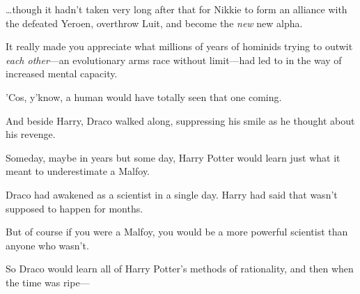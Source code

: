 …though it hadn’t taken very long after that for Nikkie to form an alliance with the defeated Yeroen, overthrow Luit, and become the \emph{new} new alpha.

It really made you appreciate what millions of years of hominids trying to outwit \emph{each other}—an evolutionary arms race without limit—had led to in the way of increased mental capacity.

’Cos, y’know, a human would have totally seen that one coming.

\later

And beside Harry, Draco walked along, suppressing his smile as he thought about his revenge.

Someday, maybe in years but some day, Harry Potter would learn just what it meant to underestimate a Malfoy.

Draco had awakened as a scientist in a single day. Harry had said that wasn’t supposed to happen for months.

But of course if you were a Malfoy, you would be a more powerful scientist than anyone who wasn’t.

So Draco would learn all of Harry Potter’s methods of rationality, and then when the time was ripe—

